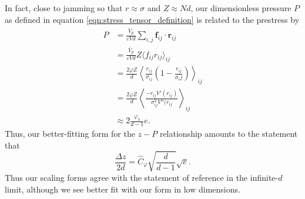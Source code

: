 In fact, close to jamming so that $r \approx \sigma$ and $Z \approx N d$, our dimensionless pressure $P$ as defined in equation \ref{eqn:stress_tensor_definition}  
is related to the prestress by
%
\begin{align} P &= \frac{\bar{V}_p}{\varepsilon Vd} \sum_{i,j} \mathbf{f}_{ij} \cdot \mathbf{r}_{ij} \\
  &=\frac{\bar{V}_p}{\varepsilon Vd} Z \langle f_{ij} r_{ij} \rangle_{ij} \\
  &=\frac{2 \varphi Z}{ d}  \left\langle \frac{r_{ij}}{\sigma_{ij}} \left(1 - \frac{r_{ij}}{\sigma_ij}\right) \right\rangle_{ij}\\
  &= \frac{2 \varphi Z}{d}  \left\langle \frac{- r_{ij} V'(r_{ij})}{\sigma_{ij}^2V''(r_{ij}} \right\rangle_{ij} \\
&\approx 2\frac{ \varphi_{\mathrm{J}} }{d-1} e.
\end{align}
%
Thus, our better-fitting form for the $z-P$ relationship amounts to the statement that
%
  \begin{equation}
    \frac{\Delta z}{2 d} =  \hat{C}_\varphi   \sqrt{\frac{d}{d-1}} \sqrt{e}.
  \end{equation}
%
 Thus our scaling forms agree with the statement of reference \cite{shimada_low-frequency_2019} in the infinite-$d$ limit, although we see better fit with our form in low dimensions.



%

